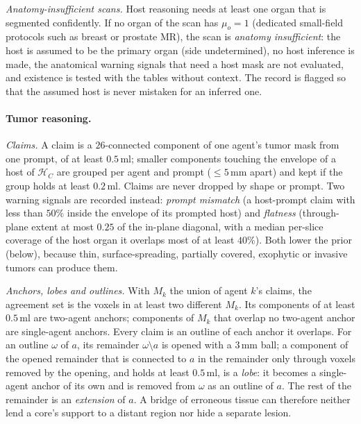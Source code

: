 \documentclass[fleqn,10pt]{olplainarticle}
\begin{document}
\emph{Anatomy-insufficient scans.} Host reasoning needs at least one organ that is segmented confidently. If no organ of the
scan has $\mu_o=1$ (dedicated small-field protocols such as breast or prostate MR), the scan is \emph{anatomy
insufficient}: the host is assumed to be the primary organ (side undetermined), no host inference is made, the anatomical
warning signals that need a host mask are not evaluated, and existence is tested with the tables without context. The
record is flagged so that the assumed host is never mistaken for an inferred one.

\paragraph{Tumor reasoning.}
\label{sec:tumor_details}
\emph{Claims.} A claim is a $26$-connected component of one agent's tumor mask from one prompt, of at least $0.5$\,ml;
smaller components touching the envelope of a host of $\mathcal{H}_C$ are grouped per agent and prompt ($\le5$\,mm apart)
and kept if the group holds at least $0.2$\,ml. Claims are never dropped by shape or prompt. Two warning signals are
recorded instead: \emph{prompt mismatch} (a host-prompt claim with less than $50\%$ inside the envelope of its prompted
host) and \emph{flatness} (through-plane extent at most $0.25$ of the in-plane diagonal, with a median per-slice coverage of
the host organ it overlaps most of at least $40\%$). Both lower the prior (below), because thin, surface-spreading,
partially covered, exophytic or invasive tumors can produce them.

\emph{Anchors, lobes and outlines.} With $M_k$ the union of agent $k$'s claims, the agreement set is the voxels in at least
two different $M_k$. Its components of at least $0.5$\,ml are two-agent anchors; components of $M_k$ that overlap no
two-agent anchor are single-agent anchors. Every claim is an outline of each anchor it overlaps. For an outline $\omega$ of
$a$, its remainder $\omega\setminus a$ is opened with a $3$\,mm ball; a component of the opened remainder that is
connected to $a$ in the remainder only through voxels removed by the opening, and holds at least $0.5$\,ml, is a
\emph{lobe}: it becomes a single-agent anchor of its own and is removed from $\omega$ as an outline of $a$. The rest of the
remainder is an \emph{extension} of $a$. A bridge of erroneous tissue can therefore neither lend a core's support to a
distant region nor hide a separate lesion.
\end{document}
